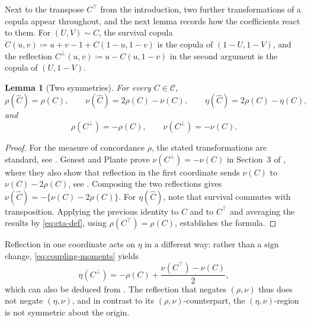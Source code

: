 \documentclass[11pt,a4paper]{article}
\newtheorem{lemma}[theorem]{Lemma}
\theoremstyle{remark}
\newcommand{\1}{\mathbf{1}}
\newcommand{\CC}{\mathcal{C}}
\begin{document}
Next to the transpose $C^\top$ from the introduction, two further transformations of a copula appear throughout, and the next lemma records how the coefficients react to them.
For $(U,V)\sim C$, the survival copula $\widehat C(u,v)\coloneqq u+v-1+C(1-u,1-v)$ is the copula of $(1-U,1-V)$, and the reflection $C^\perp(u,v)\coloneqq u-C(u,1-v)$ in the second argument is the copula of $(U,1-V)$.

\begin{lemma}[Two symmetries]
\label{lem:symmetries}
For every $C\in\CC$,
\begin{equation}
  \label{eq:survival-transform}
  \rho(\widehat C)=\rho(C),\qquad
  \nu(\widehat C)=2\rho(C)-\nu(C),\qquad
  \eta(\widehat C)=2\rho(C)-\eta(C),
\end{equation}
and
\begin{equation}
  \label{eq:reflection-transform}
  \rho(C^\perp)=-\rho(C),\qquad
  \nu(C^\perp)=-\nu(C).
\end{equation}
\end{lemma}

\begin{proof}
For the measure of concordance $\rho$, the stated transformations are standard, see \cite{scarsini1984measures}.
Genest and Plante prove $\nu(C^\perp)=-\nu(C)$ in Section~3 of \cite{genest2003blest}, where they also show that reflection in the first coordinate sends $\nu(C)$ to $\nu(C)-2\rho(C)$, see \cite[Frm.~(5)]{genest2003blest}.
Composing the two reflections gives $\nu(\widehat C)=-\{\nu(C)-2\rho(C)\}$.
For $\eta(\widehat C)$, note that survival commutes with transposition.
Applying the previous identity to $C$ and to $C^\top$ and averaging the results by \eqref{eq:eta-def}, using $\rho(C^\top)=\rho(C)$, establishes the formula.
\end{proof}

Reflection in one coordinate acts on $\eta$ in a different way: rather than a sign change, \eqref{eq:coupling-moments} yields
\begin{equation}
  \label{eq:eta-reflection}
  \eta(C^\perp)=-\rho(C)+\frac{\nu(C^\top)-\nu(C)}{2},
\end{equation}
which can also be deduced from \cite[Sec.~4]{genest2003blest}.
The reflection that negates $(\rho,\nu)$ thus does not negate $(\eta,\nu)$, and in contrast to its $(\rho,\nu)$-counterpart, the $(\eta,\nu)$-region is not symmetric about the origin.
\end{document}
